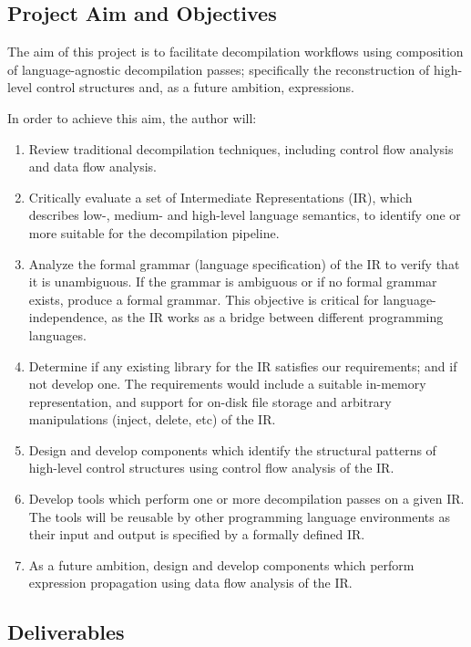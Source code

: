 \documentclass[12pt, a4paper]{article}
\begin{document}
\subsection{Project Aim and Objectives}

The aim of this project is to facilitate decompilation workflows using composition of language-agnostic decompilation passes; specifically the reconstruction of high-level control structures and, as a future ambition, expressions.

In order to achieve this aim, the author will:
\begin{enumerate}
	\item Review traditional decompilation techniques, including control flow analysis and data flow analysis.
	\item Critically evaluate a set of Intermediate Representations (IR), which describes low-, medium- and high-level language semantics, to identify one or more suitable for the decompilation pipeline.
	\item Analyze the formal grammar (language specification) of the IR to verify that it is unambiguous. If the grammar is ambiguous or if no formal grammar exists, produce a formal grammar. This objective is critical for language-independence, as the IR works as a bridge between different programming languages.
	\item Determine if any existing library for the IR satisfies our requirements; and if not develop one. The requirements would include a suitable in-memory representation, and support for on-disk file storage and arbitrary manipulations (inject, delete, etc) of the IR.
	\item Design and develop components which identify the structural patterns of high-level control structures using control flow analysis of the IR.
	\item Develop tools which perform one or more decompilation passes on a given IR. The tools will be reusable by other programming language environments as their input and output is specified by a formally defined IR.
	\item As a future ambition, design and develop components which perform expression propagation using data flow analysis of the IR.
\end{enumerate}


\subsection{Deliverables}
\end{document}
